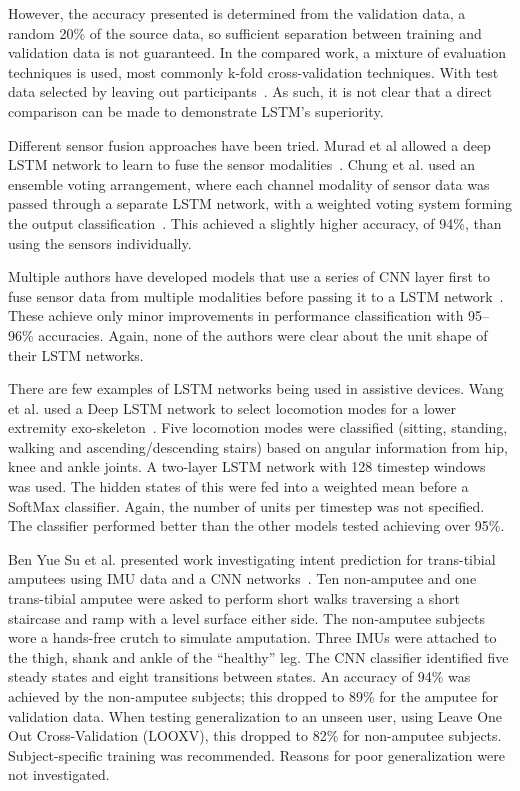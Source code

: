 However, the accuracy presented is determined from the validation data, a random 20\% of the source data, so sufficient separation between training and validation data is not guaranteed. In the compared work, a mixture of evaluation techniques is used, most commonly k-fold cross-validation techniques. With test data selected by leaving out participants~\cite{Koller2018, Sprager2015}. As such, it is not clear that a direct comparison can be made to demonstrate LSTM's superiority.

Different sensor fusion approaches have been tried. Murad et al allowed a deep LSTM network to learn to fuse the sensor modalities~\cite{Murad2017}. Chung et al. used an ensemble voting arrangement, where each channel modality of sensor data was passed through a separate LSTM network, with a weighted voting system forming the output classification~\cite{Chung2019}. This achieved a slightly higher accuracy, of 94\%, than using the sensors individually.

Multiple authors have developed models that use a series of CNN layer first to fuse sensor data from multiple modalities before passing it to a LSTM network~\cite{Abbaspour2020, Ihianle2020, Mutegeki2020, Wang2020, Mekruksavanich2020}. These achieve only minor improvements in performance classification with 95--96\% accuracies. Again, none of the authors were clear about the unit shape of their LSTM networks.

There are few examples of LSTM networks being used in assistive devices. Wang et al. used a Deep LSTM network to select locomotion modes for a lower extremity exo-skeleton~\cite{Wang2018}. Five locomotion modes were classified (sitting, standing, walking and ascending/descending stairs) based on angular information from hip, knee and ankle joints. A two-layer LSTM network with 128 timestep windows was used. The hidden states of this were fed into a weighted mean before a SoftMax classifier. Again, the number of units per timestep was not specified. The classifier performed better than the other models tested achieving over 95\%.

Ben Yue Su et al. presented work investigating intent prediction for trans-tibial amputees using IMU data and a CNN networks~\cite{Su2019}. Ten non-amputee and one trans-tibial amputee were asked to perform short walks traversing a short staircase and ramp with a level surface either side. The non-amputee subjects wore a hands-free crutch to simulate amputation. Three IMUs were attached to the thigh, shank and ankle of the ``healthy'' leg. The CNN classifier identified five steady states and eight transitions between states. An accuracy of 94\% was achieved by the non-amputee subjects; this dropped to 89\% for the amputee for validation data. When testing generalization to an unseen user, using Leave One Out Cross-Validation (LOOXV), this dropped to 82\% for non-amputee subjects. Subject-specific training was recommended. Reasons for poor generalization were not investigated.

